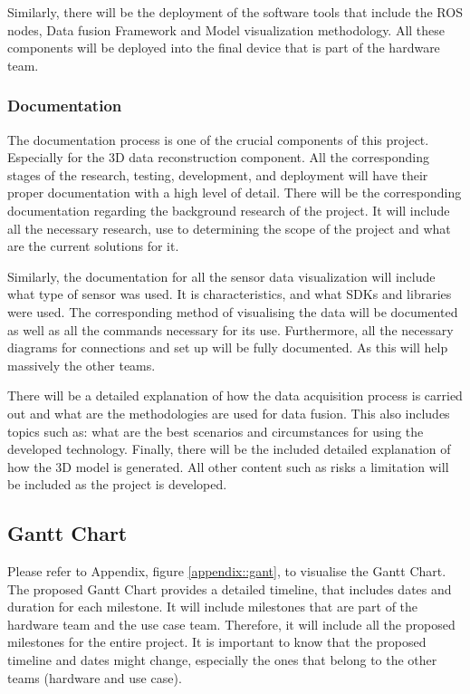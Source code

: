 \documentclass[12pt]{report}
\begin{document}
Similarly, there will be the deployment of the software tools that include the ROS nodes, Data fusion Framework and Model visualization methodology. 
All these components will be deployed into the final device that is part of the hardware team. 

\subsubsection{Documentation}
The documentation process is one of the crucial components of this project. 
Especially for the 3D data reconstruction component. All the corresponding stages of the research, testing, development, and deployment will have their proper documentation with a high level of detail. 
There will be the corresponding documentation regarding the background research of the project. 
It will include all the necessary research, use to determining the scope of the project and what are the current solutions for it. 

Similarly, the documentation for all the sensor data visualization will include what type of sensor was used. It is characteristics, and what SDKs and libraries were used. 
The corresponding method of visualising the data will be documented as well as all the commands necessary for its use. 
Furthermore, all the necessary diagrams for connections and set up will be fully documented. As this will help massively the other teams. 

There will be a detailed explanation of how the data acquisition process is carried out and what are the methodologies are used for data fusion. 
This also includes topics such as: what are the best scenarios and circumstances for using the developed technology. 
Finally, there will be the included detailed explanation of how the 3D model is generated. 
All other content such as risks a limitation will be included as the project is developed.

\subsection{Gantt Chart}
Please refer to Appendix, figure \ref{appendix::gant}, to visualise the Gantt Chart. The proposed Gantt Chart provides a detailed timeline, that includes dates and duration for each milestone. 
It will include milestones that are part of the hardware team and the use case team. Therefore, it will include all the proposed milestones for the entire project. 
It is important to know that the proposed timeline and dates might change, especially the ones that belong to the other teams (hardware and use case). 
\end{document}
